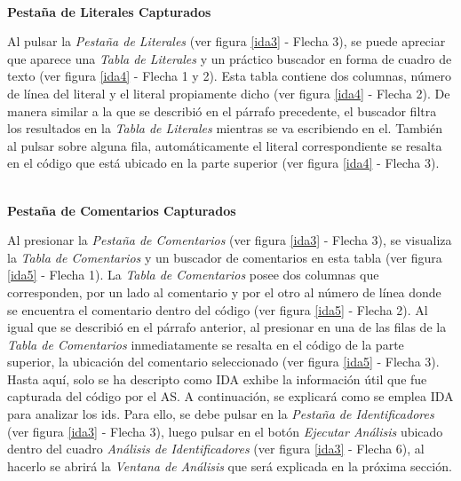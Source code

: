 \noindent \textbf{\\Pestaña de Literales Capturados\\} 

Al pulsar la \textit{Pestaña de Literales} (ver figura \ref{ida3} - Flecha 3), se puede apreciar que aparece una \textit{Tabla de Literales} y un práctico buscador en forma de cuadro de texto (ver figura \ref{ida4} - Flecha 1 y 2). Esta tabla contiene dos columnas, número de línea del literal y el literal propiamente dicho (ver figura \ref{ida4} - Flecha 2).
De manera similar a la que se describió en el párrafo precedente, el buscador filtra los resultados en la \textit{Tabla de Literales} mientras se va escribiendo en el. También al pulsar sobre alguna fila, automáticamente el literal correspondiente se resalta en el código que está ubicado en la parte superior (ver figura \ref{ida4} - Flecha 3).

\noindent \textbf{\\Pestaña de Comentarios Capturados\\} 

Al presionar la \textit{Pestaña de Comentarios} (ver figura \ref{ida3} - Flecha 3), se visualiza la \textit{Tabla de Comentarios} y un buscador de comentarios en esta tabla (ver figura \ref{ida5} - Flecha 1). La \textit{Tabla de Comentarios} posee dos columnas que corresponden, por un lado al comentario y por el otro al número de línea donde se encuentra el comentario dentro del código (ver figura \ref{ida5} - Flecha 2). Al igual que se describió en el párrafo anterior, al presionar en una de las filas de la \textit{Tabla de Comentarios} inmediatamente se resalta en el código de la parte superior, la ubicación del comentario seleccionado (ver figura \ref{ida5} - Flecha 3).\\

Hasta aquí, solo se ha descripto como IDA exhibe la información útil que fue capturada del código por el AS. A continuación, se explicará como se emplea IDA para analizar los ids. Para ello, se debe pulsar en la \textit{Pestaña de Identificadores} (ver figura \ref{ida3} - Flecha 3), luego pulsar en el botón \textit{Ejecutar Análisis} ubicado dentro del cuadro \textit{Análisis de Identificadores} (ver figura \ref{ida3} - Flecha 6), al hacerlo se abrirá la \textit{Ventana de Análisis} que será explicada en la próxima sección.

